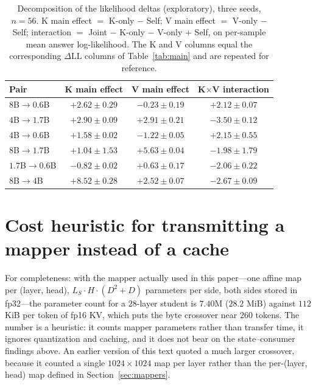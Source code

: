 \documentclass[11pt]{article}
\newcommand{\dll}{\Delta\text{LL}}
\begin{document}
\begin{table}[t]
\centering
\small
\caption{Decomposition of the likelihood deltas (exploratory), three seeds,
$n=56$. K main effect $=$ K-only $-$ Self; V main effect $=$ V-only $-$ Self;
interaction $=$ Joint $-$ K-only $-$ V-only $+$ Self, on per-sample mean answer
log-likelihood. The K and V columns equal the corresponding $\dll$ columns of
Table~\ref{tab:main} and are repeated for reference.}
\label{tab:factorial}
\begin{tabular}{lccc}
\toprule
Pair & K main effect & V main effect & K$\times$V interaction \\
\midrule
$8$B$\to0.6$B   & $+2.62{\pm}0.29$ & $-0.23{\pm}0.19$ & $+2.12{\pm}0.07$ \\
$4$B$\to1.7$B   & $+2.90{\pm}0.09$ & $+2.91{\pm}0.21$ & $-3.50{\pm}0.12$ \\
$4$B$\to0.6$B   & $+1.58{\pm}0.02$ & $-1.22{\pm}0.05$ & $+2.15{\pm}0.55$ \\
$8$B$\to1.7$B   & $+1.04{\pm}1.53$ & $+5.63{\pm}0.04$ & $-1.98{\pm}1.79$ \\
$1.7$B$\to0.6$B & $-0.82{\pm}0.02$ & $+0.63{\pm}0.17$ & $-2.06{\pm}0.22$ \\
$8$B$\to4$B     & $+8.52{\pm}0.28$ & $+2.52{\pm}0.07$ & $-2.67{\pm}0.09$ \\
\bottomrule
\end{tabular}
\end{table}

\section{Cost heuristic for transmitting a mapper instead of a cache}
\label{app:cost}
For completeness: with the mapper actually used in this paper---one affine map
per (layer, head), $L_S\cdot H\cdot(D^2+D)$ parameters per side, both sides
stored in fp32---the parameter count for a $28$-layer student is $7.40$M
($28.2$ MiB) against $112$ KiB per token of fp16 KV, which puts the byte
crossover near $260$ tokens. The number is a heuristic: it counts mapper
parameters rather than transfer time, it ignores quantization and caching, and it
does not bear on the state--consumer findings above. An earlier version of this
text quoted a much larger crossover, because it counted a single
$1024\times1024$ map per layer rather than the per-(layer, head) map defined in
Section~\ref{sec:mappers}.
\end{document}
